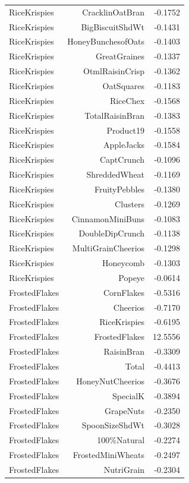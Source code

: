 \begin{longtable}{@{}lrr@{}}
RiceKrispies & CracklinOatBran & -0.1752 \\
RiceKrispies & BigBiscuitShdWt & -0.1431 \\
RiceKrispies & HoneyBunchesofOats & -0.1403 \\
RiceKrispies & GreatGraines & -0.1337 \\
RiceKrispies & OtmlRaisinCrisp & -0.1362 \\
RiceKrispies & OatSquares & -0.1183 \\
RiceKrispies & RiceChex & -0.1568 \\
RiceKrispies & TotalRaisinBran & -0.1383 \\
RiceKrispies & Product19 & -0.1558 \\
RiceKrispies & AppleJacks & -0.1584 \\
RiceKrispies & CaptCrunch & -0.1096 \\
RiceKrispies & ShreddedWheat & -0.1169 \\
RiceKrispies & FruityPebbles & -0.1380 \\
RiceKrispies & Clusters & -0.1269 \\
RiceKrispies & CinnamonMiniBuns & -0.1083 \\
RiceKrispies & DoubleDipCrunch & -0.1138 \\
RiceKrispies & MultiGrainCheerios & -0.1298 \\
RiceKrispies & Honeycomb & -0.1303 \\
RiceKrispies & Popeye & -0.0614 \\
FrostedFlakes & CornFlakes & -0.5316 \\
FrostedFlakes & Cheerios & -0.7170 \\
FrostedFlakes & RiceKrispies & -0.6195 \\
FrostedFlakes & FrostedFlakes & 12.5556 \\
FrostedFlakes & RaisinBran & -0.3309 \\
FrostedFlakes & Total & -0.4413 \\
FrostedFlakes & HoneyNutCheerios & -0.3676 \\
FrostedFlakes & SpecialK & -0.3894 \\
FrostedFlakes & GrapeNuts & -0.2350 \\
FrostedFlakes & SpoonSizeShdWt & -0.3028 \\
FrostedFlakes & 100\%Natural & -0.2274 \\
FrostedFlakes & FrostedMiniWheats & -0.2497 \\
FrostedFlakes & NutriGrain & -0.2304 \\

\end{longtable}
